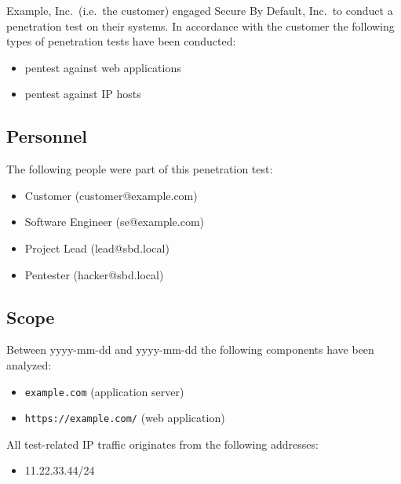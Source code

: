 \documentclass[a4paper]{article}
\newcommand{\passthrough}[1]{\lstset{mathescape=false}#1\lstset{mathescape=true}}
\begin{document}
Example, Inc.\ (i.e.\ the customer) engaged Secure By Default, Inc.\ to conduct a penetration test on their systems.
In accordance with the customer the following types of penetration tests have been conducted:

\begin{itemize}
      \item pentest against web applications
      \item pentest against IP hosts
  \end{itemize}

\subsection{Personnel}

The following people were part of this penetration test:

\begin{itemize}
      \item Customer (customer@example.com)

      \item Software Engineer (se@example.com)

      \item Project Lead (lead@sbd.local)

      \item Pentester (hacker@sbd.local)

  \end{itemize}

\subsection{Scope}

Between yyyy-mm-dd and yyyy-mm-dd the following components have been analyzed:

\begin{itemize}
      \item \passthrough{\lstinline!example.com!} (application server)

      \item \passthrough{\lstinline!https://example.com/!} (web application)

  \end{itemize}

All test-related IP traffic originates from the following addresses:

\begin{itemize}
  \item 11.22.33.44/24
\end{itemize}
\end{document}
